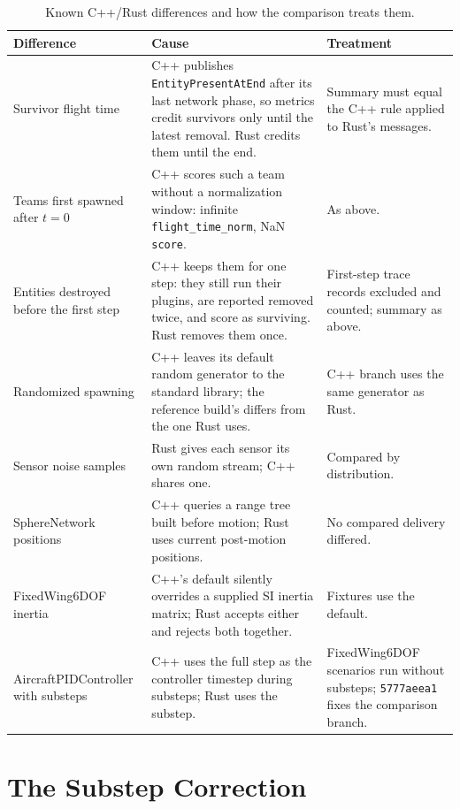\documentclass[conference]{IEEEtran}
\begin{document}
\begin{table}[t]
\centering
\caption{Known C++/Rust differences and how the comparison treats them.}
\label{tab:differences}
\small
\begin{tabularx}{\textwidth}{P{0.18\textwidth}>{\raggedright\arraybackslash}XP{0.22\textwidth}}
\toprule
Difference & Cause & Treatment \\
\midrule
Survivor flight time &
C++ publishes \texttt{EntityPresentAtEnd} after its last network phase, so
metrics credit survivors only until the latest removal. Rust credits them until
the end. &
Summary must equal the C++ rule applied to Rust's messages. \\
Teams first spawned after $t=0$ &
C++ scores such a team without a normalization window: infinite
\texttt{flight\_time\_norm}, NaN \texttt{score}. &
As above. \\
Entities destroyed before the first step &
C++ keeps them for one step: they still run their plugins, are reported removed
twice, and score as surviving. Rust removes them once. &
First-step trace records excluded and counted; summary as above. \\
Randomized spawning &
C++ leaves its default random generator to the standard library; the reference
build's differs from the one Rust uses. &
C++ branch uses the same generator as Rust. \\
Sensor noise samples &
Rust gives each sensor its own random stream; C++ shares one. &
Compared by distribution. \\
SphereNetwork positions &
C++ queries a range tree built before motion; Rust uses current post-motion
positions. &
No compared delivery differed. \\
FixedWing6DOF inertia &
C++'s default silently overrides a supplied SI inertia matrix; Rust accepts
either and rejects both together. &
Fixtures use the default. \\
AircraftPIDController with substeps &
C++ uses the full step as the controller timestep during substeps; Rust uses
the substep. &
FixedWing6DOF scenarios run without substeps; \texttt{5777aeea1} fixes the
comparison branch. \\
\bottomrule
\end{tabularx}
\end{table}

\section{The Substep Correction}
\label{app:substeps}
\end{document}
